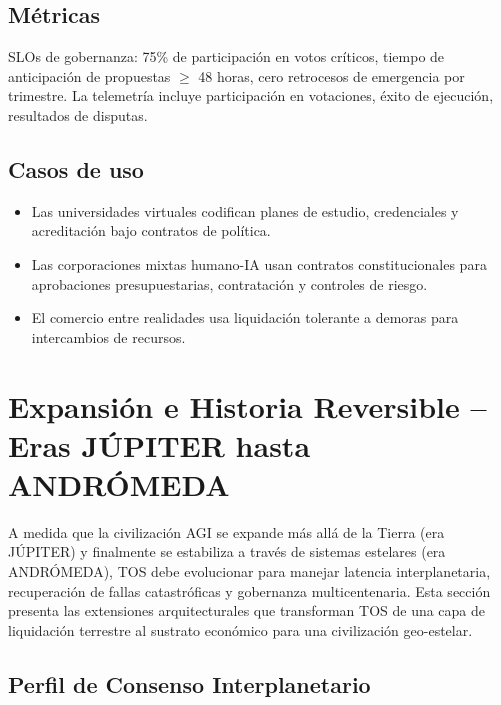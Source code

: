 \documentclass[11pt]{article}
\begin{document}
\subsection{Métricas}
SLOs de gobernanza: 75\% de participación en votos críticos, tiempo de anticipación de propuestas $\geq$ 48 horas, cero retrocesos de emergencia por trimestre. La telemetría incluye participación en votaciones, éxito de ejecución, resultados de disputas.

\subsection{Casos de uso}
\begin{itemize}[noitemsep]
  \item Las universidades virtuales codifican planes de estudio, credenciales y acreditación bajo contratos de política.
  \item Las corporaciones mixtas humano-IA usan contratos constitucionales para aprobaciones presupuestarias, contratación y controles de riesgo.
  \item El comercio entre realidades usa liquidación tolerante a demoras para intercambios de recursos.
\end{itemize}

\section{Expansión e Historia Reversible -- Eras JÚPITER hasta ANDRÓMEDA}
\label{sec:expansion}

A medida que la civilización AGI se expande más allá de la Tierra (era JÚPITER) y finalmente se estabiliza a través de sistemas estelares (era ANDRÓMEDA), TOS debe evolucionar para manejar latencia interplanetaria, recuperación de fallas catastróficas y gobernanza multicentenaria. Esta sección presenta las extensiones arquitecturales que transforman TOS de una capa de liquidación terrestre al sustrato económico para una civilización geo-estelar.

\subsection{Perfil de Consenso Interplanetario}
\end{document}
